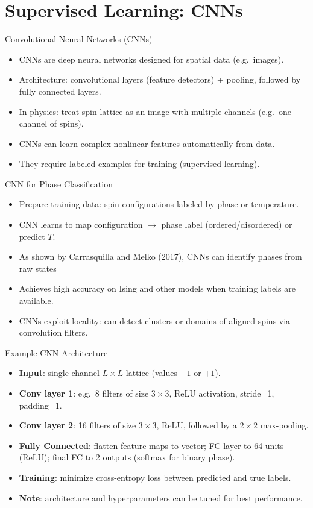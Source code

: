 \documentclass{beamer}
\begin{document}
\section{Supervised Learning: CNNs}

\begin{frame}{Convolutional Neural Networks (CNNs)}
 \begin{itemize}
   \item CNNs are deep neural networks designed for spatial data (e.g.\ images).
   \item Architecture: convolutional layers (feature detectors) + pooling, followed by fully connected layers.
   \item In physics: treat spin lattice as an image with multiple channels (e.g.\ one channel of spins).
   \item CNNs can learn complex nonlinear features automatically from data.
   \item They require labeled examples for training (supervised learning).
 \end{itemize}
\end{frame}

\begin{frame}{CNN for Phase Classification}
 \begin{itemize}
   \item Prepare training data: spin configurations labeled by phase or temperature.
   \item CNN learns to map configuration $\to$ phase label (ordered/disordered) or predict $T$.
   \item As shown by Carrasquilla and Melko (2017), CNNs can identify phases from raw states 
   \item Achieves high accuracy on Ising and other models when training labels are available.
   \item CNNs exploit locality: can detect clusters or domains of aligned spins via convolution filters.
 \end{itemize}
\end{frame}

\begin{frame}{Example CNN Architecture}
 \begin{itemize}
   \item \textbf{Input}: single-channel $L\times L$ lattice (values $-1$ or $+1$).
   \item \textbf{Conv layer 1}: e.g.\ 8 filters of size $3\times3$, ReLU activation, stride=1, padding=1.
   \item \textbf{Conv layer 2}: 16 filters of size $3\times3$, ReLU, followed by a $2\times2$ max-pooling.
   \item \textbf{Fully Connected}: flatten feature maps to vector; FC layer to 64 units (ReLU); final FC to 2 outputs (softmax for binary phase).
   \item \textbf{Training}: minimize cross-entropy loss between predicted and true labels.
   \item \textbf{Note}: architecture and hyperparameters can be tuned for best performance.
 \end{itemize}
\end{frame}
\end{document}
